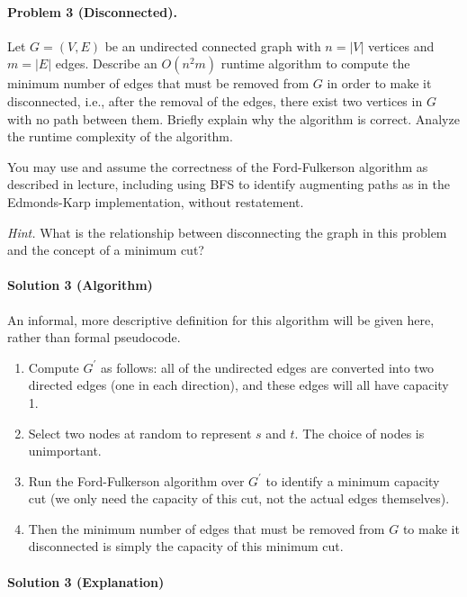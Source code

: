 \documentclass[11pt]{article}
\begin{document}

\newpage
\paragraph{Problem 3 (Disconnected).} Let $G = (V, E)$ be an undirected connected graph with $n=|V|$ vertices and $m=|E|$ edges. Describe an $O(n^2 m)$ runtime algorithm to compute the minimum number of edges that must be removed from $G$ in order to make it disconnected, i.e., after the removal of the edges, there exist two vertices in $G$ with no path between them. Briefly explain why the algorithm is correct. Analyze the runtime complexity of the algorithm.

You may use and assume the correctness of the Ford-Fulkerson algorithm as described in lecture, including using BFS to identify augmenting paths as in the Edmonds-Karp implementation, without restatement.

\textit{Hint.} What is the relationship between disconnecting the graph in this problem and the concept of a minimum cut?

\paragraph{Solution 3 (Algorithm)}

An informal, more descriptive definition for this algorithm will be given here, rather than formal pseudocode.

\begin{enumerate}
    \item Compute $G^{'}$ as follows: all of the undirected edges are converted into two directed edges (one in each direction), and these edges will all have capacity 1.
    \item Select two nodes at random to represent $s$ and $t$. The choice of nodes is unimportant.
    \item Run the Ford-Fulkerson algorithm over $G^{'}$ to identify a minimum capacity cut (we only need the capacity of this cut, not the actual edges themselves).
    \item Then the minimum number of edges that must be removed from $G$ to make it disconnected is simply the capacity of this minimum cut.
\end{enumerate}

\paragraph{Solution 3 (Explanation)}
\end{document}
